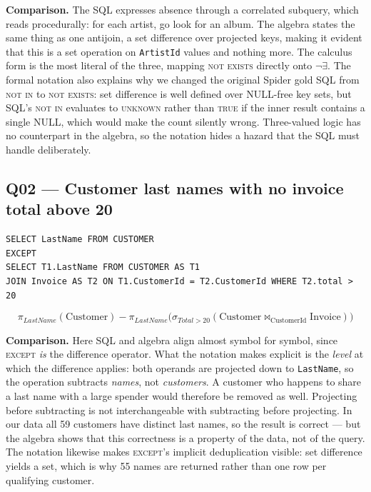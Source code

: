 \documentclass[11pt]{article}
\newcommand{\proj}[1]{\pi_{#1}}
\newcommand{\sel}[1]{\sigma_{#1}}
\newcommand{\jn}{\bowtie}
\begin{document}
\textbf{Comparison.} The SQL expresses absence through a correlated subquery, which reads
procedurally: for each artist, go look for an album. The algebra states the same thing as one
antijoin, a set difference over projected keys, making it evident that this is a set operation on
\texttt{ArtistId} values and nothing more. The calculus form is the most literal of the three,
mapping \textsc{not exists} directly onto $\neg\exists$. The formal notation also explains why
we changed the original Spider gold SQL from \textsc{not in} to \textsc{not exists}: set
difference is well defined over NULL-free key sets, but SQL's \textsc{not in} evaluates to
\textsc{unknown} rather than \textsc{true} if the inner result contains a single NULL, which
would make the count silently wrong. Three-valued logic has no counterpart in the algebra, so
the notation hides a hazard that the SQL must handle deliberately.

\subsection*{Q02 --- Customer last names with no invoice total above 20}

\begin{lstlisting}
SELECT LastName FROM CUSTOMER
EXCEPT
SELECT T1.LastName FROM CUSTOMER AS T1
JOIN Invoice AS T2 ON T1.CustomerId = T2.CustomerId WHERE T2.total > 20
\end{lstlisting}

\[
\proj{LastName}(\text{Customer}) -
\proj{LastName}\bigl(\sel{Total>20}(
  \text{Customer} \jn_{\text{CustomerId}} \text{Invoice})\bigr)
\]

\textbf{Comparison.} Here SQL and algebra align almost symbol for symbol, since \textsc{except}
\emph{is} the difference operator. What the notation makes explicit is the \emph{level} at which
the difference applies: both operands are projected down to \texttt{LastName}, so the operation
subtracts \emph{names}, not \emph{customers}. A customer who happens to share a last name with a
large spender would therefore be removed as well. Projecting before subtracting is not
interchangeable with subtracting before projecting. In our data all 59 customers have distinct
last names, so the result is correct --- but the algebra shows that this correctness is a
property of the data, not of the query. The notation likewise makes \textsc{except}'s implicit
deduplication visible: set difference yields a set, which is why 55 names are returned rather
than one row per qualifying customer.
\end{document}
